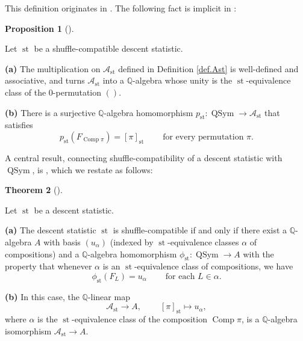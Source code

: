 \documentclass[numbers=enddot,12pt,final,onecolumn,notitlepage]{scrartcl}%
\theoremstyle{definition}
\newtheorem{theo}{Theorem}[section]
\newenvironment{theorem}[1][]
{\begin{theo}[#1]\begin{leftbar}}
{\end{leftbar}\end{theo}}
\newtheorem{prop}[theo]{Proposition}
\newenvironment{proposition}[1][]
{\begin{prop}[#1]\begin{leftbar}}
{\end{leftbar}\end{prop}}
\newenvironment{verlong}{}{}
\begin{document}
This definition originates in \cite[\S 3.1]{part1}.
The following fact is implicit in \cite{part1}:

\begin{proposition}
\label{prop.Ast.alg}Let $\operatorname{st}$ be a shuffle-compatible descent statistic.

\begin{verlong}
\textbf{(a)} The multiplication on $\mathcal{A}_{\operatorname{st}}$ defined
in Definition \ref{def.Ast} is well-defined and associative, and turns
$\mathcal{A}_{\operatorname{st}}$ into a $\mathbb{Q}$-algebra whose unity is
the $\operatorname{st}$-equivalence class of the $0$-permutation
$\left( \right)$.

\textbf{(b)}
\end{verlong}
There is a surjective $\mathbb{Q}$-algebra homomorphism
$p_{\operatorname{st}}:\operatorname*{QSym}\rightarrow\mathcal{A}%
_{\operatorname{st}}$ that satisfies
\[
p_{\operatorname{st}}\left(  F_{\operatorname*{Comp}\pi}\right)  =\left[
\pi\right]  _{\operatorname{st}}\ \ \ \ \ \ \ \ \ \ \text{for every
permutation }\pi.
\]

\end{proposition}

A central result, connecting shuffle-compatibility of a descent
statistic with $\operatorname*{QSym}$, is \cite[Theorem 4.3]{part1},
which we restate as follows:

\begin{theorem}
\label{thm.4.3}Let $\operatorname{st}$ be a descent statistic.

\textbf{(a)} The descent statistic $\operatorname{st}$ is shuffle-compatible
if and only if there exist a $\mathbb{Q}$-algebra $A$ with basis $\left(
u_{\alpha}\right)  $ (indexed by $\operatorname{st}$-equivalence classes
$\alpha$ of compositions) and a $\mathbb{Q}$-algebra homomorphism
$\phi_{\operatorname{st}}:\operatorname*{QSym}\rightarrow A$ with the
property that whenever $\alpha$ is an $\operatorname{st}$-equivalence class
of compositions, we have%
\[
\phi_{\operatorname{st}}\left(  F_{L}\right)  =u_{\alpha}%
\ \ \ \ \ \ \ \ \ \ \text{for each }L\in\alpha.
\]


\textbf{(b)} In this case, the $\mathbb{Q}$-linear map%
\[
\mathcal{A}_{\operatorname{st}}\rightarrow A,\ \ \ \ \ \ \ \ \ \ \left[
\pi\right]  _{\operatorname{st}}\mapsto u_{\alpha},
\]
where $\alpha$ is the $\operatorname{st}$-equivalence class of the
composition $\operatorname*{Comp}\pi$, is a $\mathbb{Q}$-algebra isomorphism
$\mathcal{A}_{\operatorname{st}}\rightarrow A$.
\end{theorem}
\end{document}
